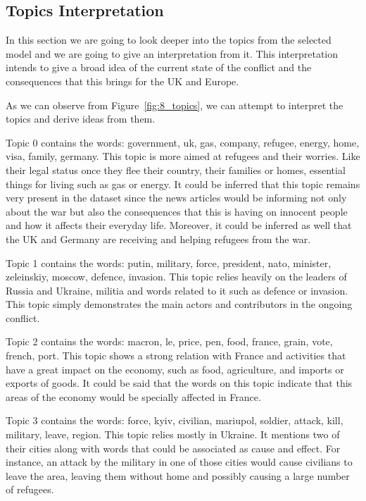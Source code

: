 \documentclass[twoside,12pt,a4paper]{article}
\begin{document}
\subsection{Topics Interpretation}
In this section we are going to look deeper into the topics from the selected model and we are going to give an interpretation from it. This interpretation intends to give a broad idea of the current state of the conflict and the consequences that this brings for the UK and Europe.

As we can observe from Figure~\ref{fig:8_topics}, we can attempt to interpret the topics and derive ideas from them.

Topic 0 contains the words: government, uk, gas, company, refugee, energy, home, visa, family, germany.  This topic is more aimed at refugees and their worries. Like their legal status once they flee their country, their families or homes, essential things for living such as gas or energy. It could be inferred that this topic remains very present in the dataset since the news articles would be informing not only about the war but also the consequences that this is having on innocent people and how it affects their everyday life. Moreover, it could be inferred as well that the UK and Germany are receiving and helping refugees from the war.

Topic 1 contains the words: putin, military, force, president, nato, minister, zeleinskiy, moscow, defence, invasion. This topic relies heavily on the leaders of Russia and Ukraine, militia and words related to it such as defence or invasion. This topic simply demonstrates the main actors and contributors in the ongoing conflict. 

Topic 2 contains the words: macron, le, price, pen, food, france, grain, vote, french, port. This topic shows a strong relation with France and activities that have a great impact on the economy, such as food, agriculture, and imports or exports of goods. It could be said that the words on this topic indicate that this areas of the economy would be specially affected in France.

Topic 3 contains the words: force, kyiv, civilian, mariupol, soldier, attack, kill, military, leave, region. This topic relies mostly in Ukraine. It mentions two of their cities along with words that could be associated as cause and effect. For instance, an attack by the military in one of those cities would cause civilians to leave the area, leaving them without home and possibly causing a large number of refugees.
\end{document}
